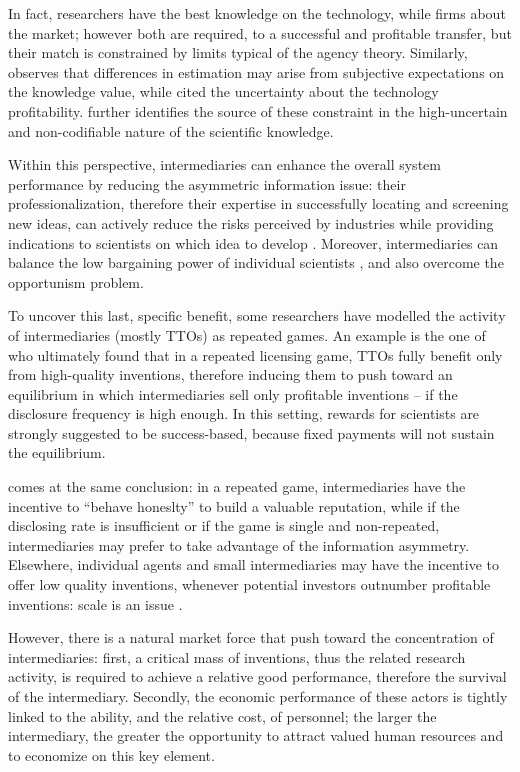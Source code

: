 In fact, researchers have the best knowledge on the technology, while firms about the market; however both are required, to a successful and profitable transfer, but their match is constrained by limits typical of the agency theory. Similarly, \citet{Bercovitz2006} observes that differences in estimation may arise from subjective expectations on the knowledge value, while \citet{Hoppe2005} cited the uncertainty about the technology profitability. \citet{Debackere2005} further identifies the source of these constraint in the high-uncertain and non-codifiable nature of the scientific knowledge.

Within this perspective, intermediaries can enhance the overall system performance by reducing the asymmetric information issue: their professionalization, therefore their expertise in successfully locating and screening new ideas, can actively reduce the risks perceived by industries while providing indications to scientists on which idea to develop \citep{Debackere2005}. Moreover, intermediaries can balance the low bargaining power of individual scientists \citep{Bercovitz2006}, and also overcome the opportunism problem.

To uncover this last, specific benefit, some researchers have modelled the activity of intermediaries (mostly TTOs) as repeated games. An example is the one of \citet{Hoppe2005} who ultimately found that in a repeated licensing game, TTOs fully benefit only from high-quality inventions, therefore inducing them to push toward an equilibrium in which intermediaries sell only profitable inventions – if the disclosure frequency is high enough. In this setting, rewards for scientists are strongly suggested to be success-based, because fixed payments will not sustain the equilibrium. 

\citet{Macho-Stadler2007} comes at the same conclusion: in a repeated game, intermediaries have the incentive to \enquote{behave honeslty} to build a valuable reputation, while if the disclosing rate is insufficient or if the game is single and non-repeated, intermediaries may prefer to take advantage of the information asymmetry. Elsewhere, individual agents and small intermediaries may have the incentive to offer low quality inventions, whenever potential investors outnumber profitable inventions: scale is an issue \citep{Hoppe2005, Macho-Stadler2007}. 

However, there is a natural market force that push toward the concentration of intermediaries: first, a critical mass of inventions, thus the related research activity, is required to achieve a relative good performance, therefore the survival of the intermediary. Secondly, the economic performance of these actors is tightly linked to the ability, and the relative cost, of personnel; the larger the intermediary, the greater the opportunity to attract valued human resources and to economize on this key element.

